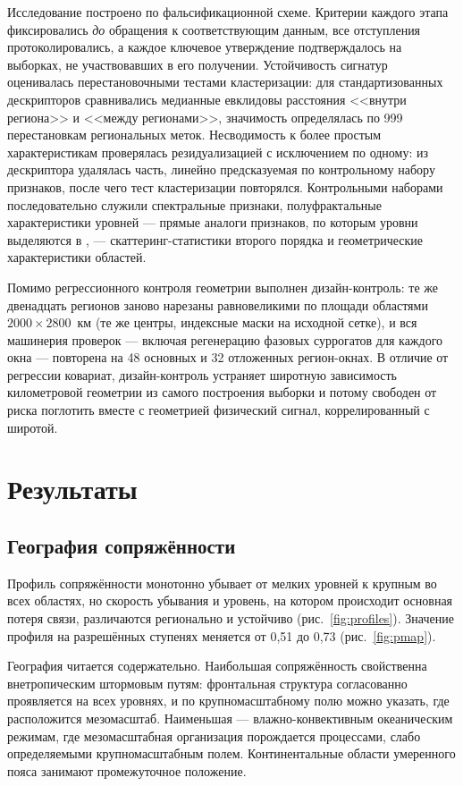 \documentclass[11pt,a4paper]{article}
\begin{document}
Исследование построено по фальсификационной схеме. Критерии каждого этапа фиксировались \emph{до} обращения к соответствующим данным, все отступления протоколировались, а каждое ключевое утверждение подтверждалось на выборках, не участвовавших в его получении. Устойчивость сигнатур оценивалась перестановочными тестами кластеризации: для стандартизованных дескрипторов сравнивались медианные евклидовы расстояния <<внутри региона>> и <<между регионами>>, значимость определялась по 999 перестановкам региональных меток. Несводимость к более простым характеристикам проверялась резидуализацией с исключением по одному: из дескриптора удалялась часть, линейно предсказуемая по контрольному набору признаков, после чего тест кластеризации повторялся. Контрольными наборами последовательно служили спектральные признаки, полуфрактальные характеристики уровней --- прямые аналоги признаков, по которым уровни выделяются в \cite{Krenke2019}, --- скаттеринг-статистики второго порядка \cite{Cheng2024} и геометрические характеристики областей.

Помимо регрессионного контроля геометрии выполнен дизайн-контроль: те же двенадцать регионов заново нарезаны равновеликими по площади областями $2000\times2800$~км (те же центры, индексные маски на исходной сетке), и вся машинерия проверок --- включая регенерацию фазовых суррогатов для каждого окна --- повторена на 48 основных и 32 отложенных регион-окнах. В отличие от регрессии ковариат, дизайн-контроль устраняет широтную зависимость километровой геометрии из самого построения выборки и потому свободен от риска поглотить вместе с геометрией физический сигнал, коррелированный с широтой.

\section{Результаты}
\label{sec:results}

\subsection{География сопряжённости}

Профиль сопряжённости монотонно убывает от мелких уровней к крупным во всех областях, но скорость убывания и уровень, на котором происходит основная потеря связи, различаются регионально и устойчиво (рис.~\ref{fig:profiles}). Значение профиля на разрешённых ступенях меняется от 0,51 до 0,73 (рис.~\ref{fig:pmap}).

География читается содержательно. Наибольшая сопряжённость свойственна внетропическим штормовым путям: фронтальная структура согласованно проявляется на всех уровнях, и по крупномасштабному полю можно указать, где расположится мезомасштаб. Наименьшая --- влажно-конвективным океаническим режимам, где мезомасштабная организация порождается процессами, слабо определяемыми крупномасштабным полем. Континентальные области умеренного пояса занимают промежуточное положение.
\end{document}

